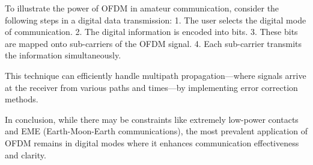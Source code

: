 To illustrate the power of OFDM in amateur communication, consider the following steps in a digital data transmission:
1. The user selects the digital mode of communication.
2. The digital information is encoded into bits.
3. These bits are mapped onto sub-carriers of the OFDM signal.
4. Each sub-carrier transmits the information simultaneously.

This technique can efficiently handle multipath propagation—where signals arrive at the receiver from various paths and times—by implementing error correction methods.

In conclusion, while there may be constraints like extremely low-power contacts and EME (Earth-Moon-Earth communications), the most prevalent application of OFDM remains in digital modes where it enhances communication effectiveness and clarity.

